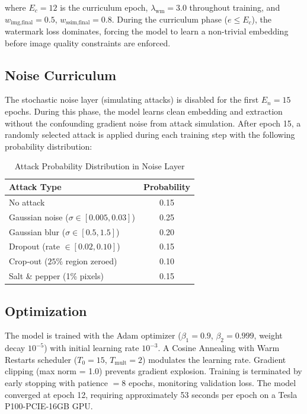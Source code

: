 \documentclass[journal]{IEEEtran}
\begin{document}
where $E_c = 12$ is the curriculum epoch, $\lambda_{\text{wm}} = 3.0$
throughout training, and $w_{\text{img,final}} = 0.5$,
$w_{\text{ssim,final}} = 0.8$. During the curriculum phase ($e \leq
E_c$), the watermark loss dominates, forcing the model to learn a
non-trivial embedding before image quality constraints are enforced.

\subsection{Noise Curriculum}

The stochastic noise layer (simulating attacks) is disabled for the
first $E_n = 15$ epochs. During this phase, the model learns clean
embedding and extraction without the confounding gradient noise from
attack simulation. After epoch 15, a randomly selected attack is applied
during each training step with the following probability distribution:

\begin{table}[!t]
  \renewcommand{\arraystretch}{1.2}
  \caption{Attack Probability Distribution in Noise Layer}
  \label{tab:noise_prob}
  \centering
  \begin{tabular}{lc}
    \toprule
    Attack Type & Probability \\
    \midrule
    No attack & 0.15 \\
    Gaussian noise ($\sigma \in [0.005, 0.03]$) & 0.25 \\
    Gaussian blur ($\sigma \in [0.5, 1.5]$) & 0.20 \\
    Dropout (rate $\in [0.02, 0.10]$) & 0.15 \\
    Crop-out ($25\%$ region zeroed) & 0.10 \\
    Salt \& pepper (1\% pixels) & 0.15 \\
    \bottomrule
  \end{tabular}
\end{table}

\subsection{Optimization}

The model is trained with the Adam optimizer \cite{kingma2014adam}
($\beta_1 = 0.9$, $\beta_2 = 0.999$, weight decay $10^{-5}$) with
initial learning rate $10^{-3}$. A Cosine Annealing with Warm Restarts
scheduler ($T_0 = 15$, $T_{\text{mult}} = 2$) modulates the learning
rate. Gradient clipping (max norm = 1.0) prevents gradient explosion.
Training is terminated by early stopping with patience $= 8$ epochs,
monitoring validation loss. The model converged at epoch 12, requiring
approximately 53 seconds per epoch on a Tesla P100-PCIE-16GB GPU.
\end{document}
